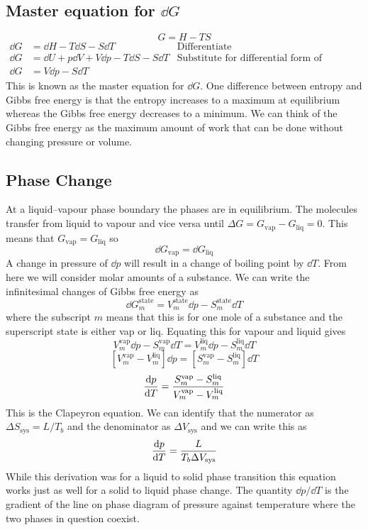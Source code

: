 \documentclass{article}
\begin{document}
    \subsection{Master equation for \(\dd G\)}
    \[G = H - TS\]
    \begin{align*}
        \dd G &= \dd H - T\dd S - S\dd T &\text{Differentiate}\\
        \dd G &= \dd U + p\dd V + V\dd p - T\dd S - S\dd T &\text{Substitute for differential form of enthalpy}\\
        \dd G &= V\dd p - S\dd T
    \end{align*}
    This is known as the master equation for \(\dd G\).
    One difference between entropy and Gibbs free energy is that the entropy increases to a maximum at equilibrium whereas the Gibbs free energy decreases to a minimum.
    We can think of the Gibbs free energy as the maximum amount of work that can be done without changing pressure or volume.
    
    \subsection{Phase Change}
    At a liquid--vapour phase boundary the phases are in equilibrium.
    The molecules transfer from liquid to vapour and vice versa until \(\Delta G = G_\text{vap} - G_\text{liq} = 0\).
    This means that \(G_\text{vap} = G_\text{liq}\) so
    \[\dd G_\text{vap} = \dd G_\text{liq}\]
    A change in pressure of \(\dd p\) will result in a change of boiling point by \(\dd T\).
    From here we will consider molar amounts of a substance.
    We can write the infinitesimal changes of Gibbs free energy as
    \[\dd G_m^\text{state} = V_m^\text{state}\dd p - S_m^\text{state}\dd T\]
    where the subscript \(m\) means that this is for one mole of a substance and the superscript state is either vap or liq.
    Equating this for vapour and liquid gives
    \[V_m^\text{vap}\dd p - S_m^\text{vap}\dd T = V_m^\text{liq}\dd p - S_m^\text{liq}\dd T\]
    \[[V_m^\text{vap} - V_m^\text{liq}]\dd p = [S_m^\text{vap} - S_m^\text{liq}]\dd T\]
    \[\dv{p}{T} = \frac{S_m^\text{vap} - S_m^\text{liq}}{V_m^\text{vap} - V_m^\text{liq}}\]
    This is the Clapeyron equation.
    We can identify that the numerator as \(\Delta S_\text{sys} = L/T_b\) and the denominator as \(\Delta V_\text{sys}\) and we can write this as
    \[\dv{p}{T} = \frac{L}{T_b\Delta V_\text{sys}}\]
    While this derivation was for a liquid to solid phase transition this equation works just as well for a solid to liquid phase change.
    The quantity \(\dd p/\dd T\) is the gradient of the line on phase diagram of pressure against temperature where the two phases in question coexist.
    
\end{document}
